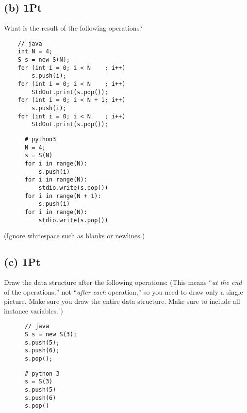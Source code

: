\documentclass{tufte-handout}
\begin{document}
    \subsection*{(b) 1Pt}
      What is the result of the following operations?
      \begin{minipage}{7cm}
      \begin{verbatim}
	// java 
	int N = 4;	
	S s = new S(N);
	for (int i = 0; i < N    ; i++) 
	    s.push(i);
	for (int i = 0; i < N    ; i++) 
	    StdOut.print(s.pop());
	for (int i = 0; i < N + 1; i++) 
	    s.push(i);
	for (int i = 0; i < N    ; i++) 
	    StdOut.print(s.pop());
      \end{verbatim}
      \end{minipage}
%
      \begin{minipage}{7cm}
      \begin{verbatim}
      # python3
      N = 4;
      s = S(N)
      for i in range(N):
          s.push(i)
      for i in range(N):
          stdio.write(s.pop())
      for i in range(N + 1): 
          s.push(i)
      for i in range(N): 
          stdio.write(s.pop())
      \end{verbatim}
      \end{minipage}
       
      (Ignore whitespace such as blanks or newlines.)
    \subsection*{(c) 1Pt}      
      Draw the data structure after the following operations:
      (This means ``\emph{at the end} of the operations,''
        not ``\emph{after each} operation,''  so you need to draw only a single picture.
        Make sure you draw the entire data structure.
        Make sure to include all instance variables.
        )
      \begin{minipage}{5cm}
      \begin{verbatim}
      // java
      S s = new S(3);
      s.push(5);
      s.push(6);
      s.pop();
      \end{verbatim}
      \end{minipage}
%
      \begin{minipage}{5cm}
      \begin{verbatim}
      # python 3
      s = S(3)
      s.push(5)
      s.push(6)
      s.pop()
      \end{verbatim}
      \end{minipage}
\end{document}
